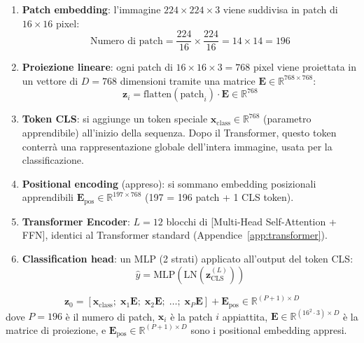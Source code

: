 \documentclass[12pt,a4paper]{article}
\begin{document}
\begin{enumerate}
    \item \textbf{Patch embedding}: l'immagine $224 \times 224 \times 3$ viene suddivisa in patch di $16 \times 16$ pixel:
    \[
        \text{Numero di patch} = \frac{224}{16} \times \frac{224}{16} = 14 \times 14 = 196
    \]

    \item \textbf{Proiezione lineare}: ogni patch di $16 \times 16 \times 3 = 768$ pixel viene proiettata in un vettore di $D = 768$ dimensioni tramite una matrice $\mathbf{E} \in \mathbb{R}^{768 \times 768}$:
    \[
        \mathbf{z}_i = \text{flatten}(\text{patch}_i) \cdot \mathbf{E} \in \mathbb{R}^{768}
    \]

    \item \textbf{Token CLS}: si aggiunge un token speciale $\mathbf{x}_{\text{class}} \in \mathbb{R}^{768}$ (parametro apprendibile) all'inizio della sequenza. Dopo il Transformer, questo token conterr\`a una rappresentazione globale dell'intera immagine, usata per la classificazione.

    \item \textbf{Positional encoding} (appreso): si sommano embedding posizionali apprendibili $\mathbf{E}_{\text{pos}} \in \mathbb{R}^{197 \times 768}$ (197 = 196 patch + 1 CLS token).

    \item \textbf{Transformer Encoder}: $L = 12$ blocchi di [Multi-Head Self-Attention + FFN], identici al Transformer standard (Appendice~\ref{app:transformer}).

    \item \textbf{Classification head}: un MLP (2 strati) applicato all'output del token CLS:
    \[
        \hat{y} = \text{MLP}(\text{LN}(\mathbf{z}_{\text{CLS}}^{(L)}))
    \]
\end{enumerate}

\begin{formulabox}
\[
    \mathbf{z}_0 = [\mathbf{x}_{\text{class}};\; \mathbf{x}_1 \mathbf{E};\; \mathbf{x}_2 \mathbf{E};\; \ldots;\; \mathbf{x}_P \mathbf{E}] + \mathbf{E}_{\text{pos}} \in \mathbb{R}^{(P+1) \times D}
\]
dove $P = 196$ \`e il numero di patch, $\mathbf{x}_i$ \`e la patch $i$ appiattita, $\mathbf{E} \in \mathbb{R}^{(16^2 \cdot 3) \times D}$ \`e la matrice di proiezione, e $\mathbf{E}_{\text{pos}} \in \mathbb{R}^{(P+1) \times D}$ sono i positional embedding appresi.
\end{formulabox}
\end{document}
